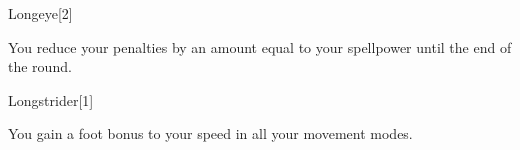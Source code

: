 \begin{spellsection}{Longeye}[2]
    \begin{spellheader}
    \end{spellheader}
    \begin{spellcontent}
        \begin{spelltargetinginfo}
        \end{spelltargetinginfo}
        \begin{spelleffects}
            \spelleffect You reduce your  penalties by an amount equal to your spellpower until the end of the round.
        \end{spelleffects}
    \end{spellcontent}
    \begin{spellfooter}
        \miscastexplode
    \end{spellfooter}
\end{spellsection}

\begin{spellsection}{Longstrider}[1]
    \begin{spellheader}
    \end{spellheader}
    \begin{spellcontent}
        \begin{spelltargetinginfo}
        \end{spelltargetinginfo}
        \begin{spelleffects}
            \spelleffect You gain a  foot bonus to your speed in all your movement modes.
            \spelldur \durlong \dismissable
        \end{spelleffects}
    \end{spellcontent}
    \begin{spellfooter}
        \miscastexplode
    \end{spellfooter}
\end{spellsection}


